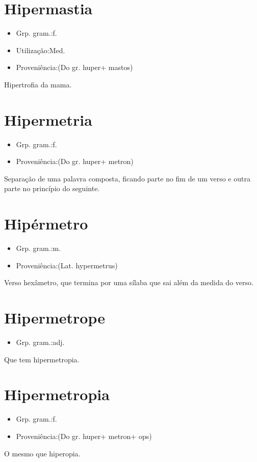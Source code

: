 \documentclass{article}
\begin{document}
\section{Hipermastia}
\begin{itemize}
\item {Grp. gram.:f.}
\end{itemize}
\begin{itemize}
\item {Utilização:Med.}
\end{itemize}
\begin{itemize}
\item {Proveniência:(Do gr. \textunderscore huper\textunderscore  + \textunderscore mastos\textunderscore )}
\end{itemize}
Hipertrofia da mama.
\section{Hipermetria}
\begin{itemize}
\item {Grp. gram.:f.}
\end{itemize}
\begin{itemize}
\item {Proveniência:(Do gr. \textunderscore huper\textunderscore  + \textunderscore metron\textunderscore )}
\end{itemize}
Separação de uma palavra composta, ficando parte no fim de um verso e outra parte no princípio do seguinte.
\section{Hipérmetro}
\begin{itemize}
\item {Grp. gram.:m.}
\end{itemize}
\begin{itemize}
\item {Proveniência:(Lat. \textunderscore hypermetrus\textunderscore )}
\end{itemize}
Verso hexâmetro, que termina por uma sílaba que sai além da medida do verso.
\section{Hipermetrope}
\begin{itemize}
\item {Grp. gram.:adj.}
\end{itemize}
Que tem hipermetropia.
\section{Hipermetropia}
\begin{itemize}
\item {Grp. gram.:f.}
\end{itemize}
\begin{itemize}
\item {Proveniência:(Do gr. \textunderscore huper\textunderscore  + \textunderscore metron\textunderscore  + \textunderscore ops\textunderscore )}
\end{itemize}
O mesmo que \textunderscore hiperopia\textunderscore .
\end{document}
